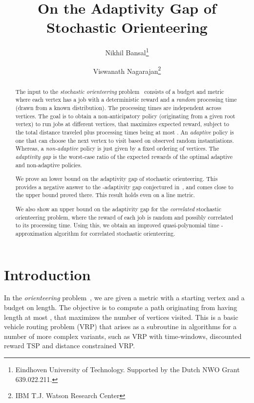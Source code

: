 \documentclass[11pt,letterpaper]{article}
\numberwithin{algorithm}{section}
\begin{document}
\title{On the Adaptivity Gap of Stochastic Orienteering}
\author{
Nikhil Bansal\thanks{Eindhoven University of Technology. Supported by the Dutch NWO Grant 639.022.211.}
\and
Viswanath Nagarajan\thanks{IBM T.J. Watson Research Center}
}
\date{}

\maketitle

\begin{abstract}
The input to the {\em stochastic orienteering} problem~\cite{GKNR12} consists of a budget  and metric  where each vertex  has a job with a deterministic reward and a \emph{random} processing time (drawn from a known distribution). The processing times are independent across vertices. The goal is to obtain a non-anticipatory policy  (originating from a given root vertex)
to run jobs at different vertices, that maximizes expected reward, subject to the total distance traveled plus processing times being at most . An {\em adaptive} policy is one that can choose the next vertex to visit based on observed random instantiations. Whereas, a {\em non-adaptive} policy is just given by a fixed ordering of vertices.
The {\em adaptivity gap} is the worst-case ratio of the expected rewards of the optimal adaptive and non-adaptive policies.

\smallskip

We prove an  lower bound on the adaptivity gap of stochastic orienteering. This provides a negative answer to the -adaptivity gap conjectured in~\cite{GKNR12}, and comes close to the  upper bound proved there. This result holds even on a line metric.


\smallskip

We also show an  upper bound on the adaptivity gap for the {\em correlated} stochastic orienteering problem, where the reward of each job is random and possibly correlated to its processing time. Using this, we obtain an improved quasi-polynomial time -approximation algorithm for correlated stochastic orienteering.

\end{abstract}

\section{Introduction}

In the {\em orienteering} problem~\cite{GLV87}, we are given a metric  with a starting vertex  and a budget  on length. The objective is to compute a path originating from  having length at most , that maximizes the number of vertices visited. This is a basic vehicle routing problem (VRP) that arises as a subroutine in algorithms for a number of more complex variants, such as VRP with
time-windows, discounted reward TSP and distance constrained VRP.
\end{document}
